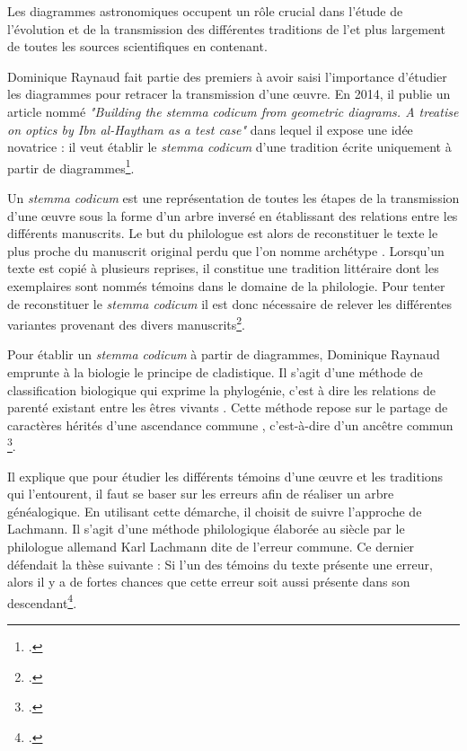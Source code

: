 Les diagrammes astronomiques occupent un rôle crucial dans l'étude de l'évolution et de la transmission des différentes traditions de l'\almageste et plus largement de toutes les sources scientifiques en contenant. 

Dominique Raynaud fait partie des premiers à avoir saisi l'importance d'étudier les diagrammes pour retracer la transmission d'une œuvre. En 2014, il publie un article nommé \textit{"Building the stemma codicum from geometric diagrams. A treatise on optics by Ibn al-Haytham as a test case"} dans lequel il expose une idée novatrice : il veut établir le \textit{stemma codicum} d'une tradition écrite uniquement à partir de diagrammes\footcite{raynaudBuildingStemmaCodicum2014}.

Un \textit{stemma codicum} est une représentation de toutes les étapes de la transmission d'une œuvre sous la forme d'un arbre inversé en établissant des relations entre les différents manuscrits. Le but du philologue est alors de reconstituer le texte le plus proche du manuscrit original perdu que l'on nomme \og archétype \fg. Lorsqu'un texte est copié à plusieurs reprises, il constitue une \og tradition littéraire \fg dont les exemplaires sont nommés \og témoins \fg dans le domaine de la philologie. Pour tenter de reconstituer le \textit{stemma codicum} il est donc nécessaire de relever les différentes variantes provenant des divers manuscrits\footcite{pouliquenUsingLatticesReconstructing}.

Pour établir un \textit{stemma codicum} à partir de diagrammes, Dominique Raynaud emprunte à la biologie le principe de cladistique. Il s'agit \og d'une méthode de classification biologique qui exprime la phylogénie, c'est à dire les relations de parenté existant entre les êtres vivants \fg. Cette méthode \og repose sur le partage de caractères hérités d'une ascendance commune \fg, c'est-à-dire d'un \og ancêtre commun \fg \footcite{tassyCladistique2012}.

Il explique que pour étudier les différents témoins d'une œuvre et les traditions qui l'entourent, il faut se baser sur les erreurs afin de réaliser un arbre généalogique. En utilisant cette démarche, il choisit de suivre l'approche de Lachmann. Il s'agit d'une méthode philologique élaborée au \XIX siècle par le philologue allemand Karl Lachmann dite de l'erreur commune. Ce dernier défendait la thèse suivante : Si l'un des témoins du texte présente une erreur, alors il y a de fortes chances que cette erreur soit aussi présente dans son descendant\footcite{pouliquenUsingLatticesReconstructing}.

